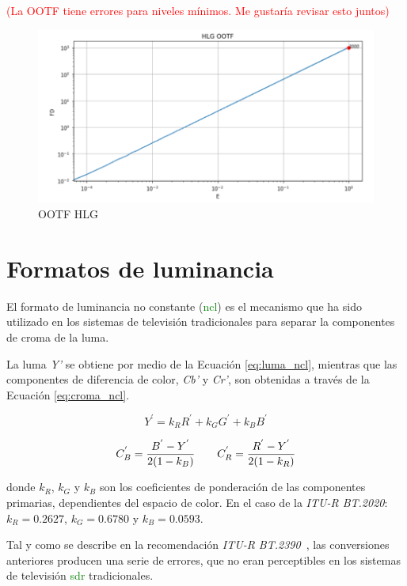 \documentclass[a4paper, 12pt]{report}
\begin{document}
\textcolor{red}{(La OOTF tiene errores para niveles mínimos. Me gustaría revisar esto juntos)}
\begin{figure}[H]
  \centering
  \includegraphics[width=12cm, keepaspectratio]{img/4_Formatos_de_TV_HDR/4_2_Sistema_HLG/4_ootf_log_log.png}
  \caption{OOTF HLG}
  \label{fig:hlg_graph_ootf}
\end{figure}

\section{Formatos de luminancia}
\label{sec:formatos_luminancia}
 El formato  de luminancia no constante (\textcolor{green}{ncl}) es el mecanismo que ha sido utilizado en los sistemas de televisión tradicionales para separar la componentes de croma de la luma.



La luma \textit{Y'} se obtiene por medio de la Ecuación \ref{eq:luma_ncl}, mientras que las componentes de diferencia de color, \textit{Cb’} y \textit{Cr’}, son obtenidas a través de la Ecuación \ref{eq:croma_ncl}.


\begin{equation} \label{eq:luma_ncl}
    Y^{'} = k_RR^{'} + k_GG^{'} + k_BB^{'}
\end{equation}

\begin{equation} \label{eq:croma_ncl}
    C_B^{'} = \frac{B^{'} - Y^{'}}{2(1 - k_B)} \qquad C_R^{'} = \frac{R^{'} - Y^{'}}{2(1 - k_R)}\\
\end{equation}

donde $k_R$, $k_G$ y $k_B$ son los coeficientes de ponderación de las componentes primarias, dependientes del espacio de color. En el caso de la \textit{ITU-R BT.2020}: $k_R = 0.2627$, $k_G = 0.6780$ y $k_B = 0.0593$.

Tal y como se describe en la recomendación \textit{ITU-R BT.2390}~\cite{itu_r:_bt2390}, las conversiones anteriores producen una serie de errores, que no eran perceptibles en los sistemas de televisión \textcolor{green}{sdr} tradicionales. 
\end{document}
